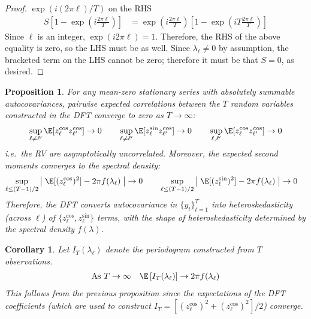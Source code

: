 \documentclass[12pt]{article}
\theoremstyle{plain}
\newtheorem{prop}[thm]{Proposition}
\newtheorem{cor}[thm]{Corollary}
\theoremstyle{definition}
\theoremstyle{remark}
\newcommand{\ra}{\rightarrow}
\newcommand{\tT}{_{t=1}^T}
\begin{document}
\begin{proof}
$\exp(i(2\pi\ell)/T)$ on the RHS
\begin{align*}
  S\left[1- \exp\left({i\frac{2\pi \ell}{T}}\right)\right]
  &=
  \exp\left({i\frac{2\pi\ell}{T}}\right)
  \left[
  1-\exp\left({iT\frac{2\pi\ell}{T}}\right)
  \right]
\end{align*}
Since $\ell$ is an integer, $\exp(i2\pi\ell)=1$.  Therefore, the RHS of
the above equality is zero, so the LHS must be as well. Since
$\lambda_\ell\neq 0$ by assumption, the bracketed term on the LHS cannot
be zero; therefore it must be that $S=0$, as desired.
\end{proof}


\begin{prop}
For any mean-zero stationary series with absolutely summable
autocovariances, pairwise expected \emph{correlations} between the
$T$ random variables constructed in the DFT converge to zero as
$T\ra\infty$:
\begin{align*}
  \sup_{\ell\neq\ell'} \E[z^{\cos}_\ell z^{\cos}_{\ell'}]
  \ra 0
  \qquad
  \sup_{\ell\neq\ell'} \E[z^{\sin}_\ell z^{\cos}_{\ell'}]
  \ra 0
  \qquad
  \sup_{\ell,\ell'} \E[z^{\cos}_\ell z^{\cos}_{\ell'}]
  \ra 0
\end{align*}
i.e.\ the RV are asymptotically uncorrelated.
Moreover, the expected second moments converges to the spectral density:
\begin{align*}
    \sup_{\ell\leq (T-1)/2}
    \big\lvert\;
      \E[(z^{\cos}_\ell)^2]
      - 2\pi f(\lambda_\ell)
    \;\big\rvert
    &\ra 0
    \qquad
    \sup_{\ell\leq (T-1)/2}
    \big\lvert\;
      \E[(z^{\sin}_\ell)^2]
      - 2\pi f(\lambda_\ell)
    \;\big\rvert
    \ra 0
\end{align*}
Therefore, the DFT converts autocovariance in $\{y_t\}\tT$ into
heteroskedasticity (across $\ell$) of $\{z_\ell^{\cos},z_\ell^{\sin}\}$
terms, with the shape of heteroskedasticity determined by the spectral
density $f(\lambda)$.
\end{prop}

\begin{cor}
Let $I_T(\lambda_\ell)$ denote the periodogram constructed from $T$
observations.
\begin{align*}
  \text{As $T\ra\infty$}\quad
  \E\left[
    I_T(\lambda_\ell)
  \right]
  \ra
  2\pi f(\lambda_\ell)
\end{align*}
This follows from the previous proposition since the expectations of the
DFT coefficients (which are used to construct
$I_T=[(z_\ell^{\cos})^2+(z_\ell^{\cos})^2]/2$) converge.
\end{cor}
\end{document}
